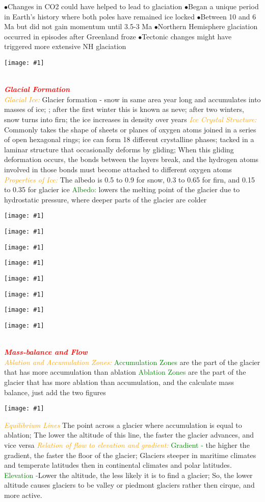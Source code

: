 \documentclass{article}
\newcommand{\ddd}{$\bullet$}
\newcommand{\red}[1]{\textcolor{red}{#1}}
\newcommand{\green}[1]{\textcolor{green}{#1}}
\newcommand{\orange}[1]{\textcolor{orange}{#1}}
\newcommand{\mysection}[1]{\\ \textbf{\textit{\red{#1}}} \\}
\newcommand{\mysub}[1]{{\textit{\orange{#1}}}}
\newcommand{\mysubsub}[1]{{{\green{#1}}}}
\newcommand{\fig}[1]{
	\texttt{[image: \#1]}
}
\begin{document}
\begin{multicols*}{4}
            \ddd Changes in CO2 could have helped to lead to glaciation
            \ddd Began a unique period in Earth’s history where both poles have remained ice locked
            \ddd Between 10 and 6 Ma but did not gain momentum until 3.5-3 Ma
            \ddd Northern Hemisphere glaciation occurred in episodes after Greenland froze
            \ddd Tectonic changes might have triggered more extensive NH glaciation
        \fig{ice_ages1}
		\mysection{Glacial Formation} %
		\mysub {Glacial Ice:}
		Glacier formation - snow in same area year long and accumulates into masses of ice; ; after the first winter this is known as neve; after two winters, snow turns into firn; the ice increases in density over years
		\mysub{Ice Crystal Structure:} 
		Commonly takes the shape of sheets or planes of oxygen atoms joined in a series of open hexagonal rings; ice can form 18 different crystalline phases; tacked in a laminar structure that occasionally deforms by gliding; When this gliding deformation occurs, the bonds between the layers break, and the hydrogen atoms involved in those bonds must become attached to different oxygen atoms
		\mysub{Properties of Ice:} The albedo is 0.5 to 0.9 for snow, 0.3 to 0.65 for firn, and 0.15 to 0.35 for glacier ice
		\mysubsub{Albedo:} lowers the melting point of the glacier due to hydrostatic pressure, where deeper parts of the glacier are colder
	    \fig{landforms}
        \fig{mtnglacier}
        \fig{moraines}
        \fig{Glacier_Types}
        \fig{hydrology}
        \fig{laurentideicesheet}
        \fig{larsencollapses}
        \fig{glacierflow2}
		\mysection{Mass-balance and Flow}
		\mysub{Ablation and Accumulation Zones:}
		\mysubsub{Accumulation Zones} are the part of the glacier that has more accumulation than ablation
		\mysubsub{Ablation Zones} are the part of the glacier that has more ablation than accumulation, and the calculate mass balance, just add the two figures
		\fig{AblationAccumulationZones}
		\mysub{Equilibrium Lines} The point across a glacier where accumulation is equal to ablation; The lower the altitude of this line, the faster the glacier advances, and vice versa
		\mysub{Relation of flow to elevation and gradient:}
		\mysubsub{Gradient -} the higher the gradient, the faster the floor of the glacier; Glaciers steeper in maritime climates and temperate latitudes then in continental climates and polar latitudes.
		\mysubsub{Elevation -}Lower the altitude, the less likely it is to find a glacier; So, the lower altitude causes glaciers to be valley or piedmont glaciers rather then cirque, and more active.

\end{multicols*}
\end{document}
